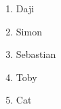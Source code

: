 
\begin{enumerate}
	\item Daji
	\item Simon
	\item Sebastian
	\item Toby
	\item Cat
\end{enumerate}


